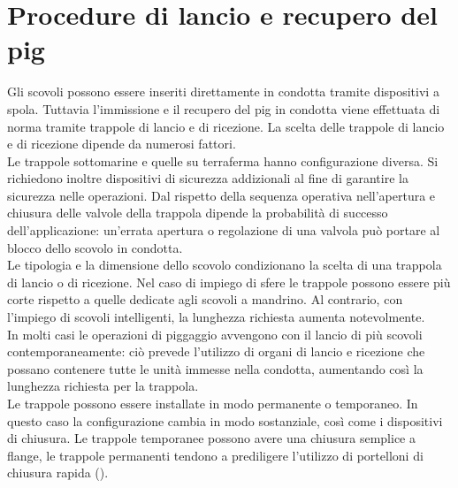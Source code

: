 \section{Procedure di lancio e recupero del pig}
Gli scovoli possono essere inseriti direttamente in condotta tramite dispositivi a spola. Tuttavia l'immissione e il recupero del pig in condotta viene effettuata di norma tramite trappole di lancio e di ricezione. La scelta delle trappole di lancio e di ricezione dipende da numerosi fattori.\\
Le trappole sottomarine e quelle su terraferma hanno configurazione diversa. Si richiedono inoltre dispositivi di sicurezza addizionali al fine di garantire la sicurezza nelle operazioni. Dal rispetto della sequenza operativa nell'apertura e chiusura delle valvole della trappola dipende la probabilità di successo dell'applicazione: un'errata apertura o regolazione di una valvola può portare al blocco dello scovolo in condotta.\\
Le tipologia e la dimensione dello scovolo condizionano la scelta di una trappola di lancio o di ricezione. Nel caso di impiego di sfere le trappole possono essere più corte rispetto a quelle dedicate agli scovoli a mandrino. Al contrario, con l'impiego di scovoli intelligenti, la lunghezza richiesta aumenta notevolmente.\\
In molti casi le operazioni di piggaggio avvengono con il lancio di più scovoli contemporaneamente: ciò prevede l'utilizzo di organi di lancio e ricezione che possano contenere tutte le unità immesse nella condotta, aumentando così la lunghezza richiesta per la trappola.\\
Le trappole possono essere installate in modo permanente o temporaneo. In questo caso la configurazione cambia in modo sostanziale, così come i dispositivi di chiusura. Le trappole temporanee possono avere una chiusura semplice a flange, le trappole permanenti tendono a prediligere l'utilizzo di portelloni di chiusura rapida ().
